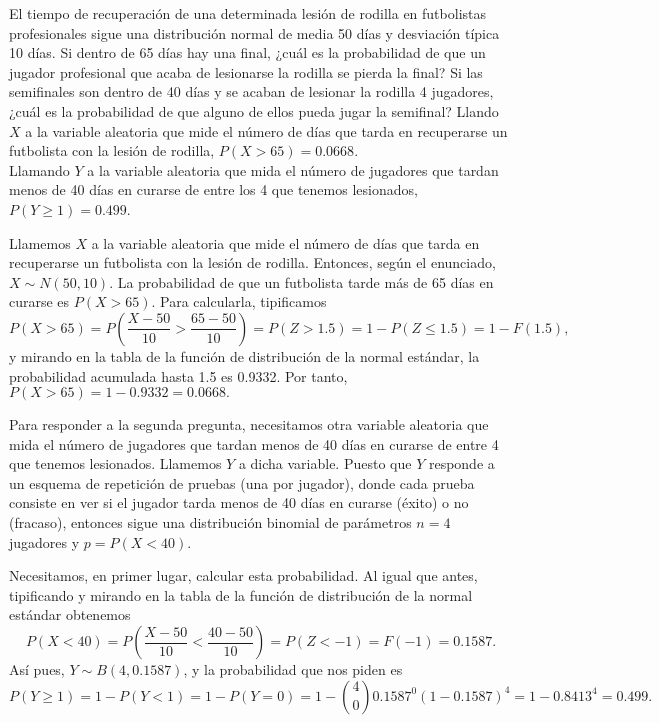 {El tiempo de recuperación de una determinada lesión de rodilla en futbolistas profesionales sigue una distribución normal de media 50 días
y desviación típica 10 días. Si dentro de 65 días hay una final, ¿cuál es la probabilidad de que un jugador profesional que acaba de
lesionarse la rodilla se pierda la final? Si las semifinales son dentro de 40 días y se acaban de lesionar la rodilla 4 jugadores, ¿cuál es
la probabilidad de que alguno de ellos pueda jugar la semifinal?
}
{Llando $X$ a la variable aleatoria que mide el número de días que tarda en recuperarse un futbolista con la lesión de rodilla, 
$P(X>65)=0.0668$.\\
Llamando $Y$ a la variable aleatoria que mida el número de jugadores que tardan menos de 40 días en curarse de entre los 4 que tenemos
lesionados, $P(Y\geq 1)=0.499$.
}
{Llamemos $X$ a la variable aleatoria que mide el número de días que tarda en recuperarse un futbolista con la lesión de rodilla. Entonces,
según el enunciado, $X\sim N(50,10)$. La probabilidad de que un futbolista tarde más de 65 días en curarse es $P(X>65)$. Para calcularla, tipificamos
\[
P(X>65)=P(\frac{X-50}{10}>\frac{65-50}{10})=P(Z>1.5)=1-P(Z\leq 1.5)=1-F(1.5),
\]
y mirando en la tabla de la función de distribución de la normal estándar, la probabilidad acumulada hasta 1.5 es 0.9332. Por tanto,
$P(X>65)=1-0.9332=0.0668.$

Para responder a la segunda pregunta, necesitamos otra variable aleatoria que mida el número de jugadores que tardan menos de 40 días en
curarse de entre 4 que tenemos lesionados. Llamemos $Y$ a dicha variable. Puesto que $Y$ responde a un esquema de repetición de pruebas (una
por jugador), donde cada prueba consiste en ver si el jugador tarda menos de 40 días en curarse (éxito) o no (fracaso), entonces sigue una
distribución binomial de parámetros $n=4$ jugadores y $p=P(X<40)$.

Necesitamos, en primer lugar, calcular esta probabilidad. Al igual que antes, tipificando y mirando en la tabla de la función de
distribución de la normal estándar obtenemos
\[
P(X<40)=P(\frac{X-50}{10}<\frac{40-50}{10})=P(Z<-1)=F(-1)=0.1587.
\]
Así pues, $Y\sim B(4,0.1587)$, y la probabilidad que nos piden es
\[
P(Y\geq 1)=1-P(Y<1)=1-P(Y=0)=1-\binom{4}{0}0.1587^0 (1-0.1587)^4=1-0.8413^4=0.499.
\]
}


